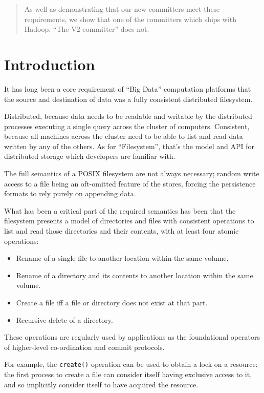 \documentclass[conference]{IEEEtran}
\begin{document}
\begin{abstract}
As well as demonstrating that our new committers meet these requirements,
we show that one of the committers which ships with Hadoop, ``The V2 committer''
  does not.

\end{abstract}


\section{Introduction}
\label{sec:introduction}

It has long been a core requirement of ``Big Data'' computation platforms that
the source and destination of data was a fully consistent distributed filesystem.

Distributed, because data needs to be readable and writable by the distributed
processes executing a single query across the cluster of computers.
Consistent, because all machines across the cluster need to be able to
list and read data written by any of the others.
As for ``Filesystem'', that's the model and API for distributed storage which
developers are familiar with.


The full semantics of a POSIX filesystem are not always necessary;
random write access to a file being an oft-omitted feature of the stores,
forcing the persistence formats to rely purely on appending data.

What has been a critical part of the required semantics has been that the filesystem
presents a model of directories and files with consistent operations to list and
read those directories and their contents, with at least four atomic operations:

\begin{itemize}
  \item Rename of a single file to another location within the same volume.
  \item Rename of a directory and its contents to another location within the same volume.
  \item Create a file iff a file or directory does not exist at that part.
  \item Recursive delete of a directory.
\end{itemize}

These operations are regularly used by applications as the foundational operators of higher-level
co-ordination and commit protocols.

For example, the \texttt{create()} operation can be used to obtain a lock on a resource:
the first process to create a file can consider itself having exclusive access to it,
and so implicitly consider itself to have acquired the resource.
\end{document}
